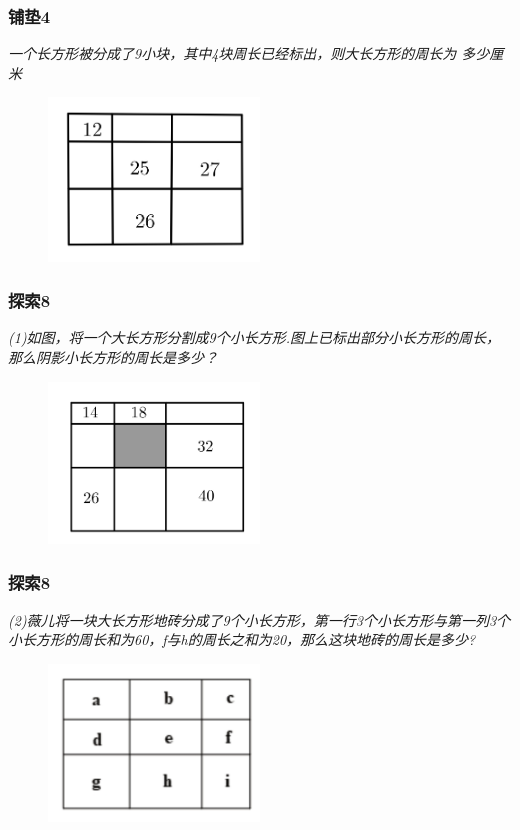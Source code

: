 \begin{frame}
    \frametitle{铺垫4}
    \textit{一个长方形被分成了9小块，其中4块周长已经标出，则大长方形的周长为
    多少厘米}
    \begin{figure}[H] 
        \centering
        \includegraphics[width=0.5\textwidth]{./pics/Chapter_1/pudian4.png}
    \end{figure}
\end{frame}

\begin{frame}
    \frametitle{探索8}
    \textit{(1)如图，将一个大长方形分割成9个小长方形.图上已标出部分小长方形的周长，那么阴影小长方形的周长是多少？}
    \begin{figure}[H] 
        \centering
        \includegraphics[width=0.5\textwidth]{./pics/Chapter_1/tansuo8_1.png}
    \end{figure}
\end{frame}

\begin{frame}
    \frametitle{探索8}
    \textit{(2)薇儿将一块大长方形地砖分成了9个小长方形，第一行3个小长方形与第一列3个小长方形的周长和为60，f与h的周长之和为20，那么这块地砖的周长是多少?}
    \begin{figure}[H] 
        \centering
        \includegraphics[width=0.5\textwidth]{./pics/Chapter_1/tansuo8_2.png}
    \end{figure}
\end{frame}

